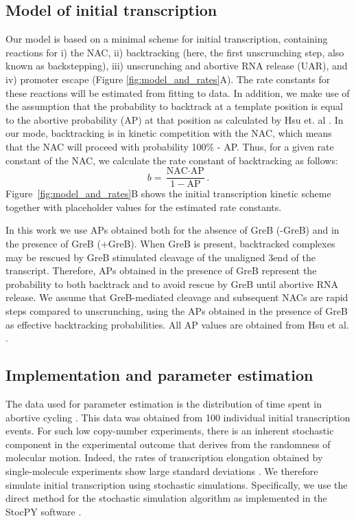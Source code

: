 %
\subsection{Model of initial transcription}
Our model is based on a minimal scheme for initial transcription, containing
reactions for i) the NAC, ii) backtracking (here, the first unscrunching step,
also known as backstepping), iii) unscrunching and abortive RNA release (UAR),
and iv) promoter escape (Figure \ref{fig:model_and_rates}A). The rate
constants for these reactions will be estimated from fitting to data. In
addition, we make use of the assumption that the probability to backtrack at a
template position is equal to the abortive probability (AP) at that position
as calculated by Hsu et. al \cite{hsu_initial_2006}. In our mode, backtracking
is in kinetic competition with the NAC, which means that the NAC will proceed
with probability 100\% - AP. Thus, for a given rate constant of the NAC, we
calculate the rate constant of backtracking as follows:
\begin{equation}
  b = \frac{\text{NAC}\cdot\text{AP}}{1-\text{AP}}.
  \label{eq:backtrackingcalc}
\end{equation}
Figure~\ref{fig:model_and_rates}B shows the initial transcription kinetic
scheme together with placeholder values for the estimated rate constants.

In this work we use APs obtained both for the absence of GreB (-GreB) and in
the presence of GreB (+GreB). When GreB is present, backtracked complexes may
be rescued by GreB stimulated cleavage of the unaligned 3\ppp end of the
transcript. Therefore, APs obtained in the presence of GreB represent the
probability to both backtrack and to avoid rescue by GreB until abortive RNA
release. We assume that GreB-mediated cleavage and subsequent NACs are rapid
steps compared to unscrunching, using the APs obtained in the presence of GreB
as effective backtracking probabilities. All AP values are obtained from Hsu
et al. \cite{hsu_initial_2006}.

\subsection{Implementation and parameter estimation}
The data used for parameter estimation is the distribution of time spent in
abortive cycling \cite{revyakin_abortive_2006}. This data was obtained from
100 individual initial transcription events. For such low copy-number
experiments, there is an inherent stochastic component in the experimental
outcome that derives from the randomness of molecular motion. Indeed, the
rates of transcription elongation obtained by single-molecule experiments show
large standard deviations \cite{adelman_single_2002,
tolic-norrelykke_diversity_2004}. We therefore simulate initial transcription
using stochastic simulations. Specifically, we use the direct method for the
stochastic simulation algorithm \cite{gillespie_exact_1977} as implemented in
the StocPY software \cite{maarleveld_stochpy:_2013}. 

